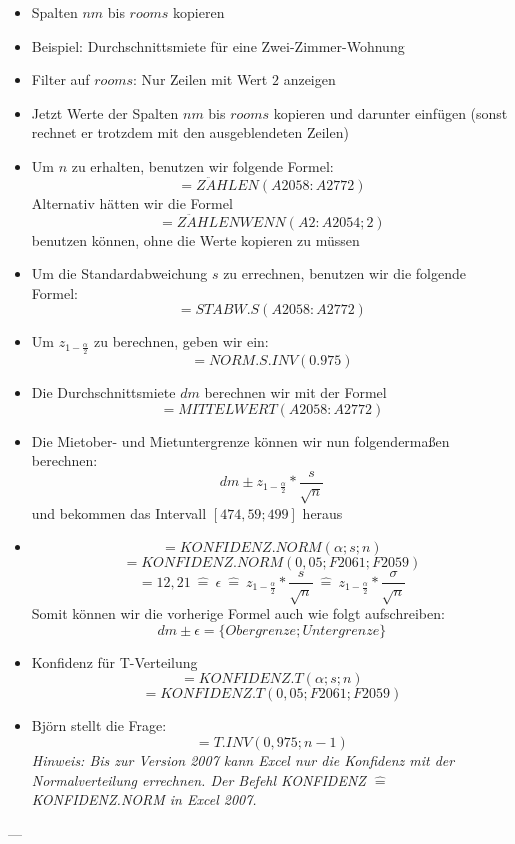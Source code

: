 \begin{itemize}
  \item Spalten $nm$ bis $rooms$ kopieren
  \item Beispiel: Durchschnittsmiete für eine Zwei-Zimmer-Wohnung
  \item Filter auf $rooms$: Nur Zeilen mit Wert $2$ anzeigen
  \item Jetzt Werte der Spalten $nm$ bis $rooms$ kopieren und darunter einfügen (sonst rechnet er trotzdem mit den
  ausgeblendeten Zeilen)
  \item Um $n$ zu erhalten, benutzen wir folgende Formel: \[=Z\ddot{A}HLEN(A2058:A2772)\]
  Alternativ hätten wir die Formel \[=Z\ddot{A}HLENWENN(A2:A2054;2)\] benutzen können, ohne die Werte kopieren zu müssen
  \item Um die Standardabweichung $s$ zu errechnen, benutzen wir die folgende Formel: \[=STABW.S(A2058:A2772)\]
  \item Um $z_{1-\frac{\alpha}{2}}$ zu berechnen, geben wir ein: \[=NORM.S.INV(0.975)\]
  \item Die Durchschnittsmiete $dm$ berechnen wir mit der Formel \[=MITTELWERT(A2058:A2772)\]
  \item Die Mietober- und Mietuntergrenze können wir nun folgendermaßen berechnen: \[dm \pm z_{1 -
  \frac{\alpha}{2}} * \frac{s}{\sqrt{n}}\]
  und bekommen das Intervall $[474,59; 499]$ heraus
  \item {} \[=KONFIDENZ.NORM(\alpha; s; n)\]
  \[=KONFIDENZ.NORM(0,05; F2061; F2059)\]
  \[= 12,21~\widehat{=}~\epsilon
  ~\widehat{=}~z_{1-\frac{\alpha}{2}} * \frac{s}{\sqrt{n}}
  ~\widehat{=}~z_{1-\frac{\alpha}{2}} * \frac{\sigma}{\sqrt{n}}\]
  Somit können wir die vorherige Formel auch wie folgt aufschreiben:
  \[dm \pm \epsilon = \{Obergrenze; Untergrenze\}\]
  \item Konfidenz für T-Verteilung \[=KONFIDENZ.T(\alpha; s; n)\]
  \[=KONFIDENZ.T(0,05; F2061; F2059)\]
  \item Björn stellt die Frage: 
  \[=T.INV(0,975; n-1)\]
  \emph{Hinweis: Bis zur Version 2007 kann Excel nur die Konfidenz mit der Normalverteilung errechnen. Der Befehl
  KONFIDENZ $\widehat{=}$ KONFIDENZ.NORM in Excel 2007.}
\end{itemize}

---

 